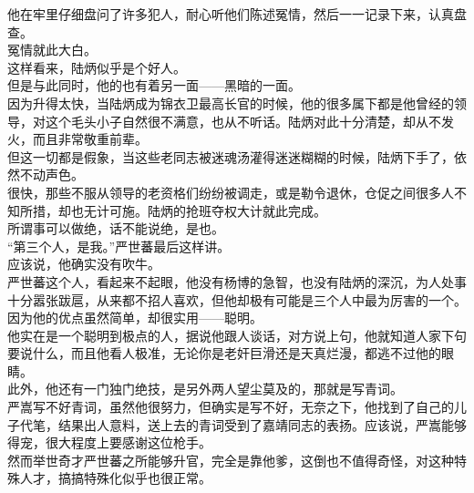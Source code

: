\begin{multicols}{\theparacolNo}
他在牢里仔细盘问了许多犯人，耐心听他们陈述冤情，然后一一记录下来，认真盘查。\\

冤情就此大白。\\

这样看来，陆炳似乎是个好人。\\

但是与此同时，他的也有着另一面——黑暗的一面。\\

因为升得太快，当陆炳成为锦衣卫最高长官的时候，他的很多属下都是他曾经的领导，对这个毛头小子自然很不满意，也从不听话。陆炳对此十分清楚，却从不发火，而且非常敬重前辈。\\

但这一切都是假象，当这些老同志被迷魂汤灌得迷迷糊糊的时候，陆炳下手了，依然不动声色。\\

很快，那些不服从领导的老资格们纷纷被调走，或是勒令退休，仓促之间很多人不知所措，却也无计可施。陆炳的抢班夺权大计就此完成。\\

所谓事可以做绝，话不能说绝，是也。\\

“第三个人，是我。”严世蕃最后这样讲。\\

应该说，他确实没有吹牛。\\

严世蕃这个人，看起来不起眼，他没有杨博的急智，也没有陆炳的深沉，为人处事十分嚣张跋扈，从来都不招人喜欢，但他却极有可能是三个人中最为厉害的一个。\\

因为他的优点虽然简单，却很实用——聪明。\\

他实在是一个聪明到极点的人，据说他跟人谈话，对方说上句，他就知道人家下句要说什么，而且他看人极准，无论你是老奸巨滑还是天真烂漫，都逃不过他的眼睛。\\

此外，他还有一门独门绝技，是另外两人望尘莫及的，那就是写青词。\\

严嵩写不好青词，虽然他很努力，但确实是写不好，无奈之下，他找到了自己的儿子代笔，结果出人意料，送上去的青词受到了嘉靖同志的表扬。应该说，严嵩能够得宠，很大程度上要感谢这位枪手。\\

然而举世奇才严世蕃之所能够升官，完全是靠他爹，这倒也不值得奇怪，对这种特殊人才，搞搞特殊化似乎也很正常。\\


\end{multicols}

